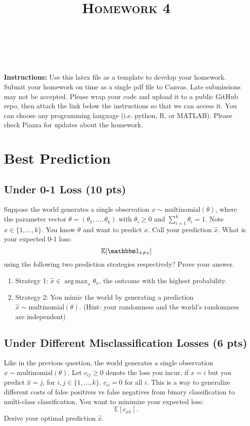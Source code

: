 \documentclass[a4paper]{article}
\title{\textsc{Homework 4}} %
\author{
\red{$>>$NAME HERE$<<$} \\
\red{$>>$ID HERE$<<$}\\
}
\date{}
\theoremstyle{definition}
\DeclareMathOperator*{\argmax}{arg\,max}
\def\E{\mathbb E}
\def\ind{\mathbbm 1}
\begin{document}
\maketitle 


\textbf{Instructions:} Use this latex file as a template to develop your homework. Submit your homework on time as a single pdf file to Canvas. Late submissions may not be accepted. Please wrap your code and upload it to a public GitHub repo, then attach the link below the instructions so that we can access it. You can choose any programming language (i.e. python, R, or MATLAB). Please check Piazza for updates about the homework.

\section{Best Prediction}
\subsection{Under 0-1 Loss (10 pts)}
Suppose the world generates a single observation $x \sim \mbox{multinomial}(\theta)$, where the parameter vector $\theta=(\theta_1, \ldots, \theta_k)$ with $\theta_i\ge 0$ and $\sum_{i=1}^k \theta_i=1$.  Note $x \in \{1, \ldots, k\}$.
You know $\theta$ and want to predict $x$. 
Call your prediction $\hat x$.  What is your expected 0-1 loss: 
$$\E[\ind_{\hat x \neq x}]$$
using the following two prediction strategies respectively?  Prove your answer.
\begin{enumerate}
    \item Strategy 1: $\hat x \in \argmax_x \theta_x$, the outcome with the highest probability.
    \item Strategy 2: You mimic the world by generating a prediction $\hat x \sim \mbox{multinomial}(\theta)$.  (Hint: your randomness and the world's randomness are independent)
\end{enumerate}

\subsection{Under Different Misclassification Losses (6 pts)}
Like in the previous question, the world generates a single observation $x \sim \mbox{multinomial}(\theta)$. Let $c_{ij} \ge 0$ denote the loss you incur, if $x=i$ but you predict $\hat x=j$, for $i,j \in \{1, \ldots, k\}$.
$c_{ii}=0$ for all $i$. This is a way to generalize different costs of false positives vs false negatives from binary classification to multi-class classification. You want to minimize your expected loss:
$$\E[c_{x \hat x}].$$
Derive your optimal prediction $\hat x$.
\end{document}
